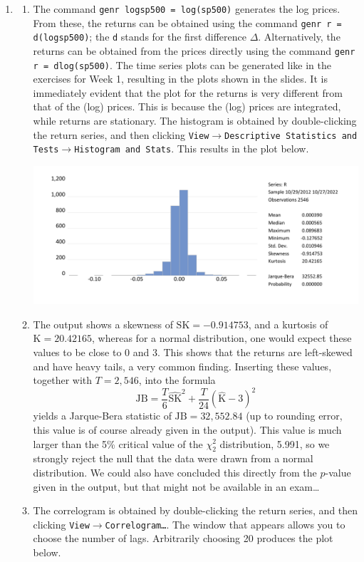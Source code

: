 \documentclass[11pt, a4paper]{article}
\begin{document}
\begin{enumerate}
\item
\begin{enumerate}
\item The command \texttt{genr logsp500 = log(sp500)} generates the log prices. From these, the returns can be obtained using the command \texttt{genr r = d(logsp500)}; the \texttt{d} stands for the first difference $\Delta$. Alternatively, the returns can be obtained from the prices directly using the command \texttt{genr r = dlog(sp500)}. The time series plots can be generated like in the exercises for Week 1, resulting in the plots shown in the slides. It is immediately evident that the plot for the returns is very different from that of the (log) prices. This is because the (log) prices are integrated, while returns are stationary. The histogram is obtained by double-clicking the return series, and then clicking \texttt{View$\rightarrow$Descriptive Statistics and Tests$\rightarrow$Histogram and Stats}. This results in the plot below.
\begin{center}
\includegraphics[width=.8\textwidth]{hist_eviews}
\end{center}
\item The output shows a skewness of $\text{SK}=-0.914753$, and a kurtosis of $\text{K}=20.42165$, whereas for a normal distribution, one would expect these values to be close to 0 and 3. This shows that the returns are left-skewed and have heavy tails, a very common finding. Inserting these values, together with $T=2,546$, into the formula
    \[ \text{JB} = \frac{T}{6}\widehat{\text{SK}}^{2} +
   \frac{T}{24}(\widehat{\text{K}}-3)^{2} \]
yields a Jarque-Bera statistic of $\text{JB}=32,552.84$ (up to rounding error, this value is of course already given in the output). This value is much larger than the 5\% critical value of the $\chi^2_2$ distribution, 5.991, so we strongly reject the null that the data were drawn from a normal distribution. We could also have concluded this directly from the $p$-value given in the output, but that might not be available in an exam\ldots
\item The correlogram is obtained by double-clicking the return series, and then clicking \texttt{View$\rightarrow$Correlogram\ldots}. The window that appears allows you to choose the number of lags. Arbitrarily choosing 20 produces the plot below.

\end{enumerate}
\end{enumerate}
\end{document}

